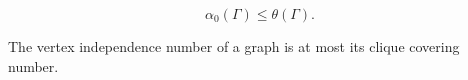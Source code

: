 $$\alpha_0(\Gamma) \leq \theta(\Gamma).$$

The vertex independence number of a graph is at most its clique covering number.
